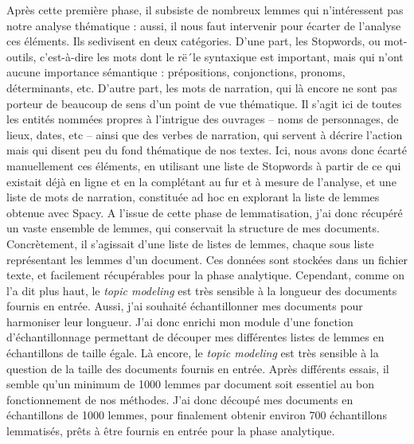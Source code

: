 \documentclass[letterpaper,portrait,12pt]{article}
\begin{document}
	Apr\`{e}s cette premi\`{e}re phase, il subsiste de nombreux lemmes qui n'int\'{e}ressent pas notre analyse th\'{e}matique : aussi, il nous faut intervenir pour \'{e}carter de l'analyse ces \'{e}l\'{e}ments. Ils sedivisent en deux cat\'{e}gories. D'une part, les Stopwords, ou mot-outils, c'est-\`{a}-dire les mots dont le r\"{e}´le syntaxique est important, mais qui n'ont aucune importance s\'{e}mantique : pr\'{e}positions, conjonctions, pronoms, d\'{e}terminants, etc. D'autre part, les mots de narration, qui l\`{a} encore ne sont pas porteur de beaucoup de sens d'un point de vue th\'{e}matique. Il s'agit ici de toutes les entit\'{e}s nomm\'{e}es propres \`{a} l'intrigue des ouvrages -- noms de personnages, de lieux, dates, etc -- ainsi que des verbes de narration, qui servent \`{a} d\'{e}crire l'action mais qui disent peu du fond th\'{e}matique de nos textes. Ici, nous avons donc \'{e}cart\'{e} manuellement ces \'{e}l\'{e}ments, en utilisant une liste de Stopwords \`{a} partir de ce qui existait d\'{e}j\`{a} en ligne et en la compl\'{e}tant au fur et \`{a} mesure de l'analyse, et une liste de mots de narration, constitu\'{e}e ad hoc en explorant la liste de lemmes obtenue avec Spacy. A l'issue de cette phase de lemmatisation, j'ai donc r\'{e}cup\'{e}r\'{e} un vaste ensemble de lemmes, qui conservait la structure de mes documents. Concr\`{e}tement, il s'agissait d'une liste de listes de lemmes, chaque sous liste repr\'{e}sentant les lemmes d'un document. Ces donn\'{e}es sont stock\'{e}es dans un fichier texte, et facilement r\'{e}cup\'{e}rables pour la phase analytique. Cependant, comme on l'a dit plus haut, le \emph{topic modeling} est tr\`{e}s sensible \`{a} la longueur des documents fournis en entr\'{e}e. Aussi, j'ai souhait\'{e} \'{e}chantillonner mes documents pour harmoniser leur longueur. J'ai donc enrichi mon module d'une fonction d'\'{e}chantillonnage permettant de d\'{e}couper mes diff\'{e}rentes listes de lemmes en \'{e}chantillons de taille \'{e}gale. L\`{a} encore, le \emph{topic modeling} est tr\`{e}s sensible \`{a} la question de la taille des documents fournis en entr\'{e}e. Apr\`{e}s diff\'{e}rents essais, il semble qu'un minimum de 1000 lemmes par document soit essentiel au bon fonctionnement de nos m\'{e}thodes. J'ai donc d\'{e}coup\'{e} mes documents en \'{e}chantillons de 1000 lemmes, pour finalement obtenir environ 700 \'{e}chantillons lemmatis\'{e}s, pr\^{e}ts \`{a} \^{e}tre fournis en entr\'{e}e pour la phase analytique.
\end{document}
